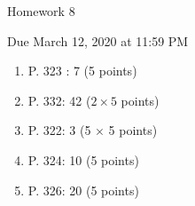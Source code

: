 \documentclass{article}
\begin{document}
\begin{center} \LARGE
Homework 8
\end{center}
\begin{center} \Large
Due March 12, 2020 at 11:59 PM 
\end{center}



\begin{enumerate}
	
	\item P. 323 : 7 (5 points)
	\item P. 332: 42 ($2 \times 5$ points)
	\item P. 322: 3 (5 $\times$ 5 points)
	\item P. 324: 10 (5 points)
	\item P. 326: 20 (5 points)

\end{enumerate}

% 
%
\end{document}
